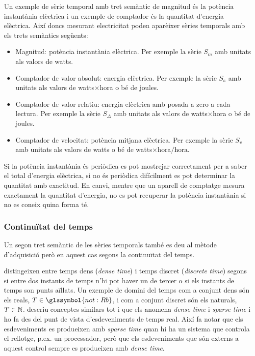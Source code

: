 \begin{example}
  \label{ex:sgst:comptador-electricitat}
  Un exemple de sèrie temporal amb tret semàntic de magnitud és la
  potència instantània elèctrica i un exemple de comptador és la
  quantitat d'energia elèctrica. Així doncs mesurant electricitat
  poden aparèixer sèries temporals amb els trets semàntics següents:

  \begin{itemize}
  \item Magnitud: potència instantània elèctrica.  Per exemple la
    sèrie $S_m$ amb unitats als valors de watts.
  \item Comptador de valor absolut: energia elèctrica. Per exemple la
    sèrie $S_a$ amb unitats als valors de watts$\times$hora o bé de
    joules.
  \item Comptador de valor relatiu: energia elèctrica amb posada a
    zero a cada lectura. Per exemple la sèrie $S_\Delta$ amb unitats
    als valors de watts$\times$hora o bé de joules.
  \item Comptador de velocitat: potència mitjana elèctrica. Per
    exemple la sèrie $S_v$ amb unitats als valors de watts o bé de
    watts$\times$hora$/$hora.
  \end{itemize}

  Si la potència instantània és periòdica es pot mostrejar
  correctament per a saber el total d'energia elèctrica, si no és
  periòdica difícilment es pot determinar la quantitat amb exactitud.
  En canvi, mentre que un aparell de comptatge mesura exactament la
  quantitat d'energia, no es pot recuperar la potència instantània si
  no es coneix quina forma té. 
\end{example}



\subsubsection{Continuïtat del temps}


Un segon tret semàntic de les sèries temporals també es deu al mètode
d'adquisició però en aquest cas segons la continuïtat del temps.

\textcite{furia10:modeling_time} distingeixen entre temps dens
(\emph{dense time}) i temps discret (\emph{discrete time}) segons si
entre dos instants de temps n'hi pot haver un de tercer o si els
instants de temps son punts aïllats. Un exemple de domini del temps
com a conjunt dens són els reals, $T\in \glssymbol{not:Rb}$, i com a
conjunt discret són els naturals, $T\in \mathbb{N}$.
\textcite[cap.~3]{kopetz11:realtime} descriu conceptes similars tot i
que els anomena \emph{dense time} i \emph{sparse time} i ho fa des del
punt de vista d'esdeveniments de temps real. Així fa notar que els
esdeveniments es produeixen amb \emph{sparse time} quan hi ha un
sistema que controla el rellotge, p.ex. un processador, però que els
esdeveniments que són externs a aquest control sempre es produeixen
amb \emph{dense time}.



